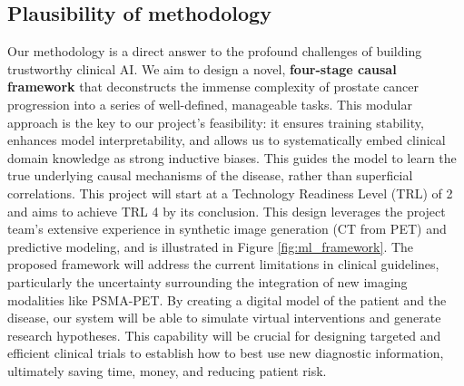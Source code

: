 \documentclass[11pt, a4paper]{article}
\begin{document}
\subsection{Plausibility of methodology}
Our methodology is a direct answer to the profound challenges of building trustworthy clinical AI. We aim to design a novel, \textbf{four-stage causal framework} that deconstructs the immense complexity of prostate cancer progression into a series of well-defined, manageable tasks. This modular approach is the key to our project's feasibility: it ensures training stability, enhances model interpretability, and allows us to systematically embed clinical domain knowledge as strong inductive biases. This guides the model to learn the true underlying causal mechanisms of the disease, rather than superficial correlations. This project will start at a Technology Readiness Level (TRL) of 2 and aims to achieve TRL 4 by its conclusion. This design leverages the project team's extensive experience in synthetic image generation (CT from PET) and predictive modeling, and is illustrated in Figure \ref{fig:ml_framework}. The proposed framework will address the current limitations in clinical guidelines, particularly the uncertainty surrounding the integration of new imaging modalities like PSMA-PET. By creating a digital model of the patient and the disease, our system will be able to simulate virtual interventions and generate research hypotheses. This capability will be crucial for designing targeted and efficient clinical trials to establish how to best use new diagnostic information, ultimately saving time, money, and reducing patient risk.
\end{document}
